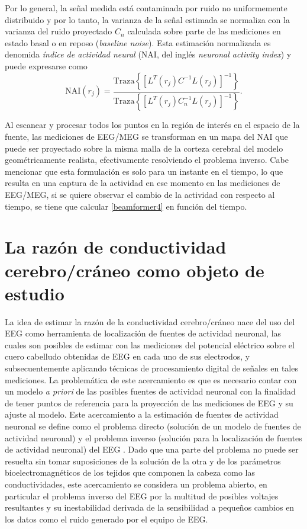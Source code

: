 Por lo general, la señal medida está contaminada por ruido no uniformemente distribuido y por lo tanto, la varianza de la señal estimada se normaliza con la varianza del ruido proyectado $C_n$ calculada sobre parte de las mediciones en estado basal o en reposo (\emph{baseline noise}).
Esta estimación normalizada es denomida \emph{índice de actividad neural} (NAI, del inglés \emph{neuronal activity index}) \cite{VanVeen1997} y puede expresarse como
\begin{equation}
	\label{beamformer4}
	\text{NAI}(r_j) = \frac{\text{Traza}\left\{[L^{T}(r_j)C^{-1}L(r_j)]^{-1}\right\}}{\text{Traza}\left\{[L^{T}(r_j)C_n^{-1}L(r_j)]^{-1}\right\}} \text{.}
\end{equation}

Al escanear y procesar todos los puntos en la región de interés en el espacio de la fuente, las mediciones de EEG/MEG se transforman en un mapa del NAI que puede ser proyectado sobre la misma malla de la corteza cerebral del modelo geométricamente realista, efectivamente resolviendo el problema inverso.
Cabe mencionar que esta formulación es solo para un instante en el tiempo, lo que resulta en una captura de la actividad en ese momento en las mediciones de EEG/MEG, si se quiere observar el cambio de la actividad con respecto al tiempo, se tiene que calcular \cref{beamformer4} en función del tiempo.

\section{La razón de conductividad cerebro/cráneo como objeto de estudio}
\label{sec:intro:study}

La idea de estimar la razón de la conductividad cerebro/cráneo nace del uso del EEG como herramienta de localización de fuentes de actividad neuronal, las cuales son posibles de estimar con las mediciones del potencial eléctrico sobre el cuero cabelludo obtenidas de EEG en cada uno de sus electrodos, y subsecuentemente aplicando técnicas de procesamiento digital de señales en tales mediciones.
La problemática de este acercamiento es que es necesario contar con un modelo \emph{a priori} de las posibles fuentes de actividad neuronal con la finalidad de tener puntos de referencia para la proyección de las mediciones de EEG y su ajuste al modelo.
Este acercamiento a la estimación de fuentes de actividad neuronal se define como el problema directo (solución de un modelo de fuentes de actividad neuronal) y el problema inverso (solución para la localización de fuentes de actividad neuronal) del EEG \cite{Hallez2007}.
Dado que una parte del problema no puede ser resuelta sin tomar suposiciones de la solución de la otra y de los parámetros bioelectromagnéticos de los tejidos que componen la cabeza como las conductividades, este acercamiento se considera un problema abierto, en particular el problema inverso del EEG por la multitud de posibles voltajes resultantes y su inestabilidad derivada de la sensibilidad a pequeños cambios en los datos como el ruido generado por el equipo de EEG.

